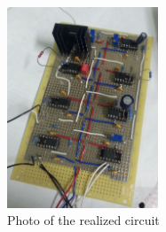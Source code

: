 \documentclass[a4paper,10pt]{article}
\begin{document}
\begin{figure}[H]
\centering
\includegraphics[width=0.4\textwidth]{photocircuit}
\caption{Photo of the realized circuit}\label{photocircuit}
\end{figure}
\end{document}
